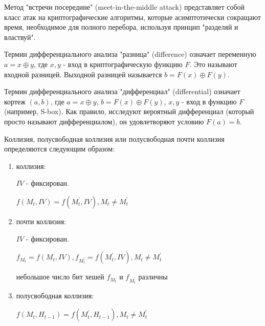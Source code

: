 \documentclass[colorthm]{./civarticle}
\begin{document}
\begin{definition}
    Метод "встречи посередине" (meet-in-the-middle attack) представляет собой класс атак на криптографические алгоритмы, которые асимптотически сокращают время, необходимое для полного перебора, используя принцип "разделяй и властвуй".
\end{definition}

\begin{definition}
    Термин дифференциального анализа "разница" (difference) означает переменную $a=x \oplus y$, где $x,y$ - вход в криптографическую функцию $F$. Это называют входной разницей. Выходной разницей называется $b=F(x) \oplus F(y)$.
\end{definition}

\begin{definition}
    Термин дифференциального анализа "дифференциал" (differential) означает кортеж $(a, b)$, где $a=x \oplus y$, $b=F(x) \oplus F(y)$, $x,y$ - вход в функцию $F$ (например, S-box). Как правило, исследуют вероятный дифференциал (который просто называют дифференциалом), он удовлетворяют условию $F(a)=b$.  
\end{definition}

\begin{definition}
    Коллизия, полусвободная коллизия или полусвободная почти коллизия определяются следующим образом:

\begin{enumerate}
    \item коллизия:

    $IV$ - фиксирован.
    
    $f\left(M_t, I V\right)=f\left(M_t^{\prime}, I V\right), M_t \neq M_t^{\prime}$

    \item почти коллизия:

    $IV$ - фиксирован.

    $f_{M_t}=f\left(M_t, I V\right), f_{M_t^{\prime}}=f\left(M_t^{\prime}, I V\right), M_t \neq M_t^{\prime}$

    небольшое число бит хешей $f_{M_t}$ и $f_{M_t^{\prime}}$ различны
    
    \item полусвободная коллизия:

    $f\left(M_t, H_{t-1}\right)=f\left(M_t^{\prime}, H_{t-1}\right), M_t \neq M_t^{\prime}$

    
\end{enumerate}

\end{definition}
\end{document}
